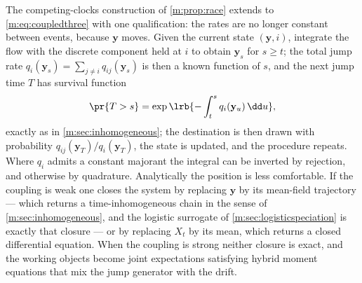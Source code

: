The competing-clocks construction of \cref{m:prop:race} extends to
\cref{m:eq:coupledthree} with one qualification: the rates are no longer constant
between events, because $\mathbf y$ moves. Given the current state
$(\mathbf y,i)$, integrate the flow with the discrete component held at $i$ to
obtain $\mathbf y_s$ for $s\ge t$; the total jump rate
$q_i(\mathbf y_s)=\sum_{j\neq i}q_{ij}(\mathbf y_s)$ is then a known function of
$s$, and the next jump time $T$ has survival function
\begin{equation}
\label{m:eq:coupledholding}
\pr{T>s} = \exp\lrb{-\int_t^{s}q_i(\mathbf y_u)\,\dd u} ,
\end{equation}
exactly as in \cref{m:sec:inhomogeneous}; the destination is then drawn with
probability $q_{ij}(\mathbf y_T)/q_i(\mathbf y_T)$, the state is updated, and the
procedure repeats. Where $q_i$ admits a constant majorant the integral can be
inverted by rejection, and otherwise by quadrature. Analytically the position is
less comfortable. If the coupling is weak one closes the system by replacing
$\mathbf y$ by its mean-field trajectory --- which returns a time-inhomogeneous
chain in the sense of \cref{m:sec:inhomogeneous}, and the logistic surrogate of
\cref{m:sec:logisticspeciation} is exactly that closure --- or by replacing $X_t$
by its mean, which returns a closed differential equation. When the coupling is
strong neither closure is exact, and the working objects become joint
expectations satisfying hybrid moment equations that mix the jump generator with
the drift.
